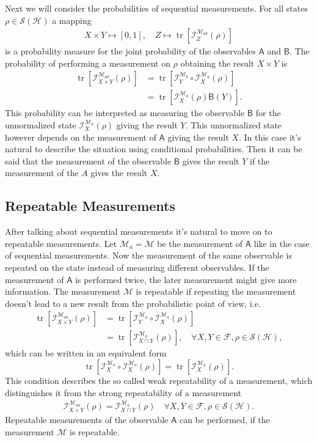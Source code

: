 \documentclass[a4paper,12pt]{wihuri}
\theoremstyle{definition}
\numberwithin{definition}{section}
\numberwithin{example}{section}
\numberwithin{theorem}{section}
\numberwithin{proposition}{section}
\numberwithin{lemma}{section}
\newcommand{\I}{\mathcal{I}}%
\newcommand{\hi}{\mathcal{H}}%
\newcommand{\salg}{\mathcal{F}}%
\newcommand{\tila}{\mathcal{S}}%
\newcommand{\mm}{\mathcal{M}}%
\newcommand{\A}{\mathsf{A}}%
\newcommand{\B}{\mathsf{B}}%
\DeclareMathOperator{\tr}{tr}
\begin{document}
Next we will consider the probabilities of sequential measurements. For all states $\rho \in \tila(\hi)$ a mapping
\begin{align*}
X \times Y \mapsto [0,1], \quad Z \mapsto \tr[\I_{Z}^{\mm_{ab}}(\rho)]
\end{align*}
is a probability measure for the joint probability of the observables $\A$ and $\B$. The probability of performing a measurement on $\rho$ obtaining the result $X \times Y$ is
\begin{align*}
\tr[\I_{X\times Y}^{\mm_{ab}}(\rho)] &= \tr[\I_Y^{\mm_b} \circ \I_X^{\mm_a}(\rho)] \\
&= \tr[\I_X^{\mm_a}(\rho)\B(Y)]\text{.}
\end{align*}
This probability can be interpreted as measuring the observable $\B$ for the unnormalized state $\I_X^{\mm_a}(\rho)$ giving the result $Y$. This unnormalized state however depends on the measurement of $\A$ giving the result $X$. In this case it's natural to describe the situation using conditional probabilities. Then it can be said that the measurement of the observable $\B$ gives the result $Y$ if the measurement of the $A$ gives the result $X$.


\subsection{Repeatable Measurements}\label{sec_repeatable}
After talking about sequential measurements it's natural to move on to repeatable measurements. Let $\mm_a = \mm$ be the measurement of $\A$ like in the case of sequential measurements. Now the measurement of the same observable is repeated on the state instead of measuring different observables. If the measurement of $\A$ is performed twice, the later measurement might give more information. The measurement $\mm$ is repeatable if repeating the measurement doesn't lead to a new result from the probabilistic point of view, i.e.
\begin{align*}
\tr[\I_{X \times Y}^{\mm_{aa}}(\rho)] &= \tr[\I_Y^{\mm_a} \circ \I_X^{\mm_a}(\rho)] \\ 
&= \tr[\I_{X \cap Y}^{\mm_a}(\rho)], \quad \forall X,Y \in \salg, \rho \in \tila(\hi),
\end{align*}
which can be written in an equivalent form
\begin{equation}
\tr[\I_X^{\mm_a} \circ \I_X^{\mm_a}(\rho)]  = \tr[\I_X^{\mm_a}(\rho)]\text{.}
\end{equation}
This condition describes the so called weak repeatability of a measurement, which distinguishes it from the strong repeatability of a measurement
\begin{align*}
\I_{X \times Y}^{\mm_{aa}}(\rho) = \I_{X \cap Y}^{\mm_a}(\rho) \quad \forall X,Y \in \salg, \rho \in \tila(\hi)\text{.}
\end{align*}
Repeatable measurements of the observable $\A$ can be performed, if the measurement $\mm$ is repeatable.
\end{document}
